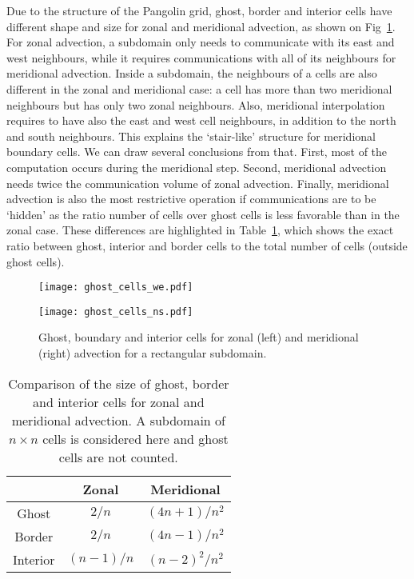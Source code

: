 Due to the structure of the Pangolin grid, ghost, border
and interior cells have different shape and size for zonal and meridional advection, as shown on
Fig~\ref{fig:ghost_cells}. For zonal advection, a subdomain only needs to
communicate with its east and west neighbours, while it requires communications
with all of its neighbours for meridional advection. Inside a subdomain, the
neighbours of a cells are also different in the zonal and meridional case: a
cell has more than two meridional neighbours but has only two zonal neighbours.
Also, meridional interpolation requires to have also the east and west cell
neighbours, in addition to the north and south neighbours. This explains the
`stair-like' structure for meridional boundary cells. We can draw several
conclusions from that. First, most of the computation occurs during the meridional step. Second, meridional
advection needs twice the communication volume of zonal advection. Finally,
meridional advection is also the most restrictive operation if communications
are to be `hidden' as the ratio number of cells over ghost cells is less
favorable than in the zonal case. These differences are highlighted in
Table~\ref{tab:size_interior}, which shows the exact ratio between ghost, interior and
border cells to the total number of cells (outside ghost cells).

\begin{figure}
  \begin{minipage}{0.49\linewidth}
    \texttt{[image: ghost\_cells\_we.pdf]}
  \end{minipage}
  \begin{minipage}{0.49\linewidth}
    \texttt{[image: ghost\_cells\_ns.pdf]}
  \end{minipage}
  \caption{%
    Ghost, boundary and interior cells for zonal (left) and meridional
  (right) advection for a rectangular subdomain.}
\label{fig:ghost_cells}
\end{figure}

\begin{table}
 \centering
 \begin{tabular}{ccc}
    \toprule
    & Zonal & Meridional \\
     \midrule
     Ghost & $2/n$ & $(4n+1)/n^2$\\
     Border & $2/n$ & $(4n-1)/n^2$ \\
     Interior & $(n-1)/n$ & ${(n-2)}^2/n^2$ \\
    \bottomrule
  \end{tabular}
  \caption{Comparison of the size of ghost, border and interior cells for zonal
  and meridional advection. A subdomain of $n\times n$ cells is considered here and
  ghost cells are not counted.}
\label{tab:size_interior}
\end{table}


